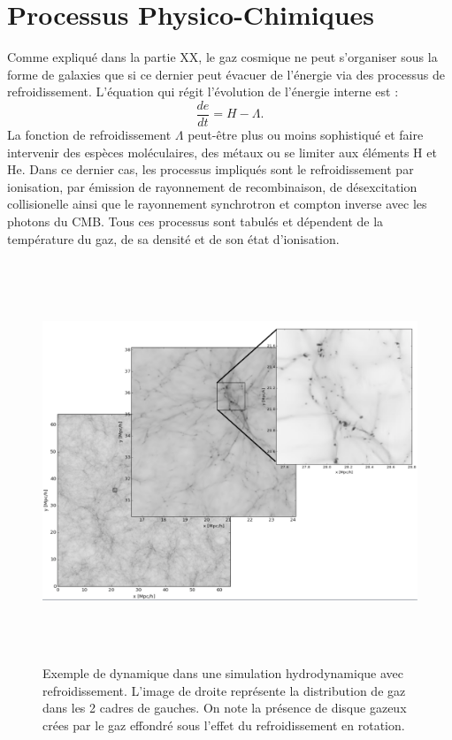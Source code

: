 \section{Processus Physico-Chimiques}
Comme expliqué dans la partie XX, le gaz cosmique ne peut s'organiser sous la forme de galaxies que si ce dernier peut évacuer de l'énergie via des processus de refroidissement. L'équation qui régit l'évolution de l'énergie interne est :
\begin{equation}
\frac{de}{dt}=H-\Lambda.
\end{equation}
La fonction de refroidissement $\Lambda$ peut-être plus ou moins sophistiqué et faire intervenir des espèces moléculaires, des métaux  ou se limiter aux éléments H et He. Dans ce dernier cas, les processus impliqués sont le refroidissement par ionisation, par émission de rayonnement de recombinaison, de désexcitation collisionelle ainsi que le rayonnement synchrotron et compton inverse avec les photons du CMB. Tous ces processus sont tabulés et dépendent de la température du gaz, de sa densité et de son état d'ionisation. 

\begin{figure}[htbp]
	\centering
		\includegraphics[height=12cm]{figs/zoom.png}
	\caption[Exemple de dynamique dans une simulation hydrodynamique avec refroidissement.]{Exemple de dynamique dans une simulation hydrodynamique avec refroidissement. L'image de droite représente la distribution de gaz dans les 2 cadres de gauches. On note la présence de disque gazeux crées par le gaz effondré sous l'effet du refroidissement en rotation.}
	\label{f:zoom}
\end{figure}



